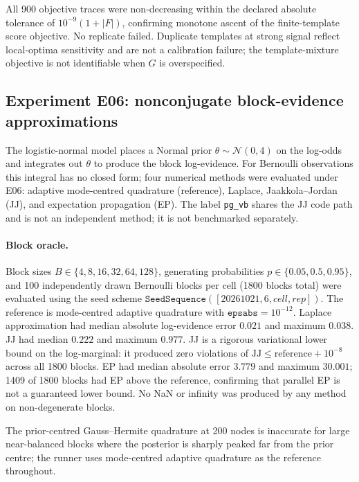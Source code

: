 All 900 objective traces were non-decreasing within the declared absolute tolerance of $10^{-9}(1+|F|)$, confirming monotone ascent of the finite-template score objective. No replicate failed. Duplicate templates at strong signal reflect local-optima sensitivity and are not a calibration failure; the template-mixture objective is not identifiable when $G$ is overspecified.





\FloatBarrier
\subsection{Experiment E06: nonconjugate block-evidence approximations}
The logistic-normal model places a Normal prior $\theta\sim\mathcal{N}(0,4)$ on the
log-odds and integrates out $\theta$ to produce the block log-evidence.
For Bernoulli observations this integral has no closed form; four numerical methods
were evaluated under E06: adaptive mode-centred quadrature (reference),
Laplace, Jaakkola--Jordan (JJ), and expectation propagation (EP).
The label \texttt{pg\_vb} shares the JJ code path and is not an independent method;
it is not benchmarked separately.

\paragraph{Block oracle.}
Block sizes $B\in\{4,8,16,32,64,128\}$, generating probabilities
$p\in\{0.05,0.5,0.95\}$, and 100 independently drawn Bernoulli blocks per cell
(1800 blocks total) were evaluated using the seed scheme
$\mathtt{SeedSequence}([20261021, 6, \textit{cell}, \textit{rep}])$.
The reference is mode-centred adaptive quadrature with $\texttt{epsabs}=10^{-12}$.
Laplace approximation had median absolute log-evidence error $0.021$ and maximum $0.038$.
JJ had median $0.222$ and maximum $0.977$.
JJ is a rigorous variational lower bound on the log-marginal: it produced zero
violations of $\mathrm{JJ}\le\mathrm{reference}+10^{-8}$ across all 1800 blocks.
EP had median absolute error $3.779$ and maximum $30.001$; 1409 of 1800 blocks had
EP above the reference, confirming that parallel EP is not a guaranteed lower bound.
No NaN or infinity was produced by any method on non-degenerate blocks.

The prior-centred Gauss--Hermite quadrature at 200 nodes is inaccurate for large
near-balanced blocks where the posterior is sharply peaked far from the prior centre;
the runner uses mode-centred adaptive quadrature as the reference throughout.

